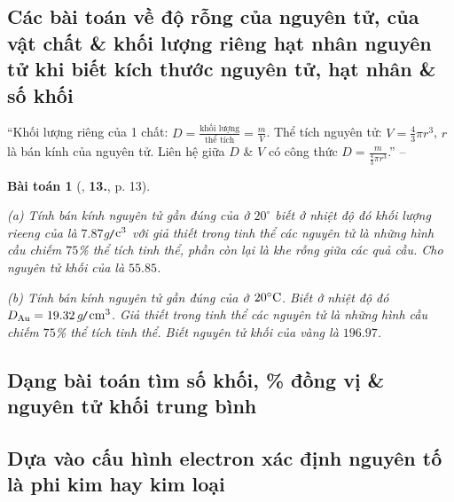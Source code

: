 \documentclass{article}
\numberwithin{equation}{section}
\newtheorem{baitoan}{Bài toán}[section]
\begin{document}

\subsection{Các bài toán về độ rỗng của nguyên tử, của vật chất \& khối lượng riêng hạt nhân nguyên tử khi biết kích thước nguyên tử, hạt nhân \& số khối}
``Khối lượng riêng của 1 chất: $D = \frac{\mbox{khối lượng}}{\mbox{thể tích}} = \frac{m}{V}$. Thể tích nguyên tử: $V = \frac{4}{3}\pi r^3$, $r$ là bán kính của nguyên tử. Liên hệ giữa $D$ \& $V$ có công thức $D = \frac{m}{\frac{4}{3}\pi r^3}$.'' -- \cite[p. 13]{An2012}

\begin{baitoan}[\cite{An2012}, \textbf{13.}, p. 13]
	\begin{enumerate*}
		\item[(a)] Tính bán kính nguyên tử gần đúng của \emph{} ở $20^\circ$ biết ở nhiệt độ đó khối lượng rieeng của \emph{} là $7.87$\emph{g\texttt{/}$\rm c^3$} với giả thiết trong tinh thể các nguyên tử \emph{} là những hình cầu chiếm $75$\% thể tích tinh thể, phần còn lại là khe rỗng giữa các quả cầu. Cho nguyên tử khối của \emph{} là $55.85$.
		\item[(b)] Tính bán kính nguyên tử gần đúng của \emph{} ở $\rm 20^\circ C$. Biết ở nhiệt độ đó $D_{\ce{Au}} = 19.32$\emph{g\texttt{/}$\rm cm^3$}. Giả thiết trong tinh thể các nguyên tử \emph{} là những hình cầu chiếm $75$\% thể tích tinh thể. Biết nguyên tử khối của vàng là $196.97$.
	\end{enumerate*}
\end{baitoan}


\newpage
\subsection{Dạng bài toán tìm số khối, \% đồng vị \& nguyên tử khối trung bình}


\subsection{Dựa vào cấu hình electron xác định nguyên tố là phi kim hay kim loại}
\end{document}
